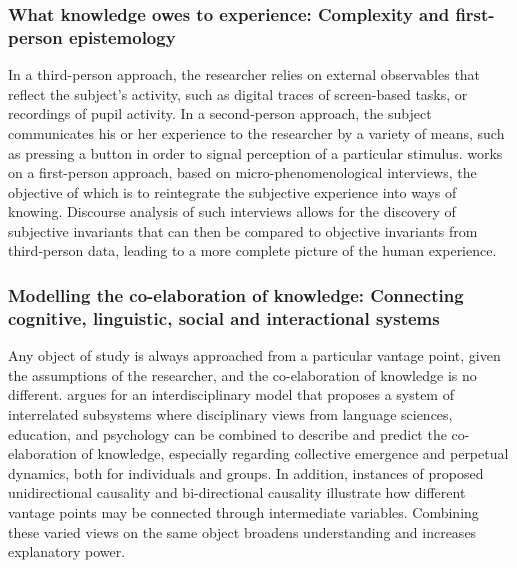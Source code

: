 \documentclass[output=paper]{langscibook}
\begin{document}
\subsubsection{What knowledge owes to experience: Complexity and first-person epistemology}

In a third-person approach, the researcher relies on external observables that reflect the subject’s activity, such as digital traces of screen-based tasks, or recordings of pupil activity. In a second-person approach, the subject communicates his or her experience to the researcher by a variety of means, such as pressing a button in order to signal perception of a particular stimulus.  works on a first-person approach, based on micro-phenomenological interviews, the objective of which is to reintegrate the subjective experience into ways of knowing. Discourse analysis of such interviews allows for the discovery of subjective invariants that can then be compared to objective invariants from third-person data, leading to a more complete picture of the human experience.

\subsubsection{Modelling the co-elaboration of knowledge: Connecting cognitive, linguistic, social and interactional systems}

Any object of study is always approached from a particular vantage point, given the assumptions of the researcher, and the co-elaboration of knowledge is no different.  argues for an interdisciplinary model that proposes a system of interrelated subsystems where disciplinary views from language sciences, education, and psychology can be combined to describe and predict the co-elaboration of knowledge, especially regarding collective emergence and perpetual dynamics, both for individuals and groups. In addition, instances of proposed unidirectional causality and bi-directional causality illustrate how different vantage points may be connected through intermediate variables. Combining these varied views on the same object broadens understanding and increases explanatory power.
\end{document}
